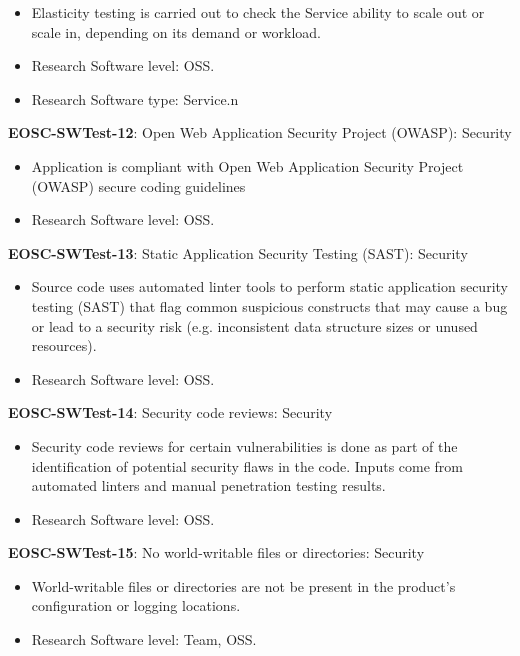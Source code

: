 \begin{itemize}
    \item Elasticity testing is carried out to check the Service ability to scale out or scale in, depending on its demand or workload. \cite{orviz_fernandez_eosc-synergy_2020}
    \item Research Software level: OSS.
    \item Research Software type: Service.n\end{itemize}

\textbf{EOSC-SWTest-12}: Open Web Application Security Project (OWASP): Security

\begin{itemize}
    \item Application is compliant with Open Web Application Security Project (OWASP) secure coding guidelines \cite{orviz_set_2017}
    \item Research Software level: OSS.
\end{itemize}

\textbf{EOSC-SWTest-13}: Static Application Security Testing (SAST): Security

\begin{itemize}
    \item Source code uses automated linter tools to perform static application security testing (SAST) that flag common suspicious constructs that may cause a bug or lead to a security risk (e.g. inconsistent data structure sizes or unused resources). \cite{orviz_set_2017}
    \item Research Software level: OSS.
\end{itemize}

\textbf{EOSC-SWTest-14}: Security code reviews: Security

\begin{itemize}
    \item Security code reviews for certain vulnerabilities is done as part of the identification of potential security flaws in the code. Inputs  come from automated linters and manual penetration testing results. \cite{gillies_modelling_1992,shepherdson_cessda_2019,orviz_set_2017}
    \item Research Software level: OSS.
\end{itemize}

\textbf{EOSC-SWTest-15}: No world-writable files or directories: Security

\begin{itemize}
    \item World-writable files or directories are not be present in the product's configuration or logging locations. \cite{orviz_set_2017}
    \item Research Software level: Team, OSS.
\end{itemize}

